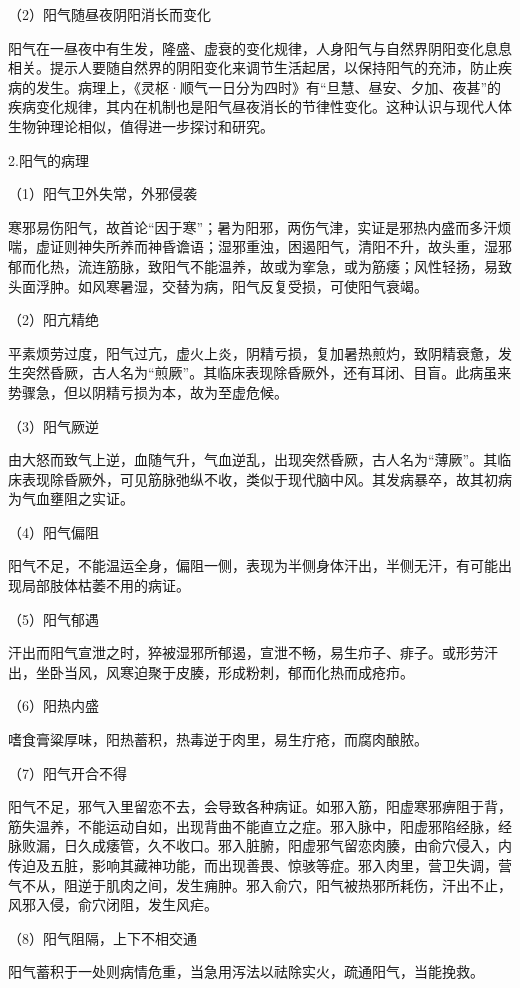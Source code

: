 \documentclass[draft,12pt]{ctexbook}
\begin{document}
（2）阳气随昼夜阴阳消长而变化

阳气在一昼夜中有生发，隆盛、虚衰的变化规律，人身阳气与自然界阴阳变化息息相关。提示人要随自然界的阴阳变化来调节生活起居，以保持阳气的充沛，防止疾病的发生。病理上，《灵枢·顺气一日分为四时》有“旦慧、昼安、夕加、夜甚”的疾病变化规律，其内在机制也是阳气昼夜消长的节律性变化。这种认识与现代人体生物钟理论相似，值得进一步探讨和研究。

2.阳气的病理

（1）阳气卫外失常，外邪侵袭

寒邪易伤阳气，故首论“因于寒”；暑为阳邪，两伤气津，实证是邪热内盛而多汗烦喘，虚证则神失所养而神昏谵语；湿邪重浊，困遏阳气，清阳不升，故头重，湿邪郁而化热，流连筋脉，致阳气不能温养，故或为挛急，或为筋痿；风性轻扬，易致头面浮肿。如风寒暑湿，交替为病，阳气反复受损，可使阳气衰竭。

（2）阳亢精绝

平素烦劳过度，阳气过亢，虚火上炎，阴精亏损，复加暑热煎灼，致阴精衰惫，发生突然昏厥，古人名为“煎厥”。其临床表现除昏厥外，还有耳闭、目盲。此病虽来势骤急，但以阴精亏损为本，故为至虚危候。

（3）阳气厥逆

由大怒而致气上逆，血随气升，气血逆乱，出现突然昏厥，古人名为“薄厥”。其临床表现除昏厥外，可见筋脉弛纵不收，类似于现代脑中风。其发病暴卒，故其初病为气血壅阻之实证。

（4）阳气偏阻

阳气不足，不能温运全身，偏阻一侧，表现为半侧身体汗出，半侧无汗，有可能出现局部肢体枯萎不用的病证。

（5）阳气郁遇

汗出而阳气宣泄之时，猝被湿邪所郁遏，宣泄不畅，易生疖子、痱子。或形劳汗出，坐卧当风，风寒迫聚于皮腠，形成粉刺，郁而化热而成疮疖。

（6）阳热内盛

嗜食膏粱厚味，阳热蓄积，热毒逆于肉里，易生疔疮，而腐肉酿脓。

（7）阳气开合不得

阳气不足，邪气入里留恋不去，会导致各种病证。如邪入筋，阳虚寒邪痹阻于背，筋失温养，不能运动自如，出现背曲不能直立之症。邪入脉中，阳虚邪陷经脉，经脉败漏，日久成痿管，久不收口。邪入脏腑，阳虚邪气留恋肉腠，由俞穴侵入，内传迫及五脏，影响其藏神功能，而出现善畏、惊骇等症。邪入肉里，营卫失调，营气不从，阻逆于肌肉之间，发生痈肿。邪入俞穴，阳气被热邪所耗伤，汗出不止，风邪入侵，俞穴闭阻，发生风疟。

（8）阳气阻隔，上下不相交通

阳气蓄积于一处则病情危重，当急用泻法以祛除实火，疏通阳气，当能挽救。
\end{document}
